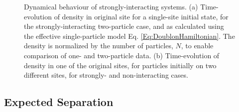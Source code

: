 \newpage

\begin{figure}[h]
    \centering
    \hfill
    \setlength{\belowcaptionskip}{1cm}
    \caption{Dynamical behaviour of strongly-interacting systems. (a) Time-evolution of density in original site for a single-site initial state, for the strongly-interacting two-particle case, and as calculated using the effective single-particle model Eq. \ref{Eq:DoublonHamiltonian}. The density is normalized by the number of particles, $N$, to enable comparison of one- and two-particle data. (b) Time-evolution of density in one of the original sites, for particles initially on two different sites, for strongly- and non-interacting cases.}
    \label{Fig:Strong_Interaction_Real_Time}
\end{figure}

\text{ }

\subsection{Expected Separation}\label{Sec:Exp_Separation}

